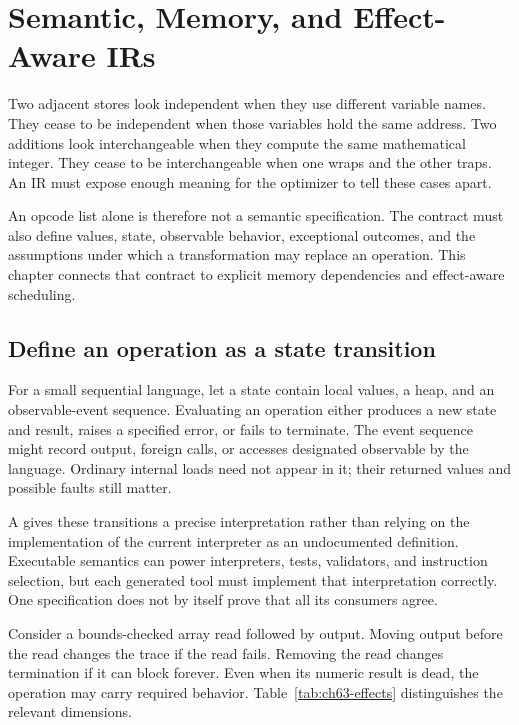 \chapter{Semantic, Memory, and Effect-Aware IRs}
\label{ch:semantic-effect-ir}

Two adjacent stores look independent when they use different variable names.
They cease to be independent when those variables hold the same address.
Two additions look interchangeable when they compute the same mathematical integer.
They cease to be interchangeable when one wraps and the other traps.
An IR must expose enough meaning for the optimizer to tell these cases apart.

An opcode list alone is therefore not a semantic specification.
The contract must also define values, state, observable behavior, exceptional outcomes, and the assumptions under which a transformation may replace an operation.
This chapter connects that contract to explicit memory dependencies and effect-aware scheduling.

\section{Define an operation as a state transition}
\label{sec:ch63-semantics}

For a small sequential language, let a state contain local values, a heap, and an observable-event sequence.
Evaluating an operation either produces a new state and result, raises a specified error, or fails to terminate.
The event sequence might record output, foreign calls, or accesses designated observable by the language.
Ordinary internal loads need not appear in it; their returned values and possible faults still matter.

A  gives these transitions a precise interpretation rather than relying on the implementation of the current interpreter as an undocumented definition.
Executable semantics can power interpreters, tests, validators, and instruction selection, but each generated tool must implement that interpretation correctly.
One specification does not by itself prove that all its consumers agree.

Consider a bounds-checked array read followed by output.
Moving output before the read changes the trace if the read fails.
Removing the read changes termination if it can block forever.
Even when its numeric result is dead, the operation may carry required behavior.
Table~\ref{tab:ch63-effects} distinguishes the relevant dimensions.

